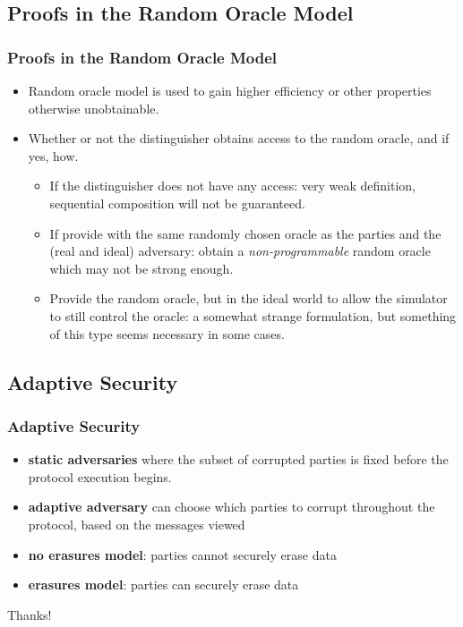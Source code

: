 \documentclass{beamer}
\begin{document}
    \subsection{Proofs in the Random Oracle Model}
    \subsectionpage
    \begin{frame}
        \frametitle{Proofs in the Random Oracle Model}
        \begin{itemize}
            \item Random oracle model is used to gain higher efficiency or other properties otherwise unobtainable.
            \item Whether or not the distinguisher obtains access to the random oracle, and if yes, how.
            \begin{itemize}
                \item If the distinguisher does not have any access: very weak definition, sequential composition will not be guaranteed. 
                \item If provide with the same randomly chosen oracle as the parties and the (real and ideal) adversary: obtain a \emph{non-programmable} random oracle which may not be strong enough. 
                \item Provide the random oracle, but in the ideal world to allow the simulator to still control the oracle: a somewhat strange formulation, but something of this type seems necessary in some cases.
            \end{itemize}
        \end{itemize}
    
        
    
    \end{frame}
    \subsection{Adaptive Security}
    \subsectionpage
    \begin{frame}
        \frametitle{Adaptive Security}
    
        \begin{itemize}
            \item \textbf{static adversaries} where the subset of corrupted parties is fixed before the protocol execution begins.
            \item \textbf{adaptive adversary} can choose which parties to corrupt throughout the protocol, based on the messages viewed
            \item \textbf{no erasures model}: parties cannot securely erase data
            \item \textbf{erasures model}: parties can securely erase data
        \end{itemize}
    
    \end{frame}




    
   
    

    \begin{frame}
        \centerline{Thanks!}
    
        
    
    \end{frame}
\end{document}
